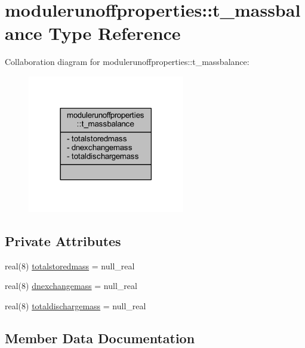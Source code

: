 \hypertarget{structmodulerunoffproperties_1_1t__massbalance}{}\section{modulerunoffproperties\+:\+:t\+\_\+massbalance Type Reference}
\label{structmodulerunoffproperties_1_1t__massbalance}


Collaboration diagram for modulerunoffproperties\+:\+:t\+\_\+massbalance\+:\nopagebreak
\begin{figure}[H]
\begin{center}
\leavevmode
\includegraphics[width=194pt]{structmodulerunoffproperties_1_1t__massbalance__coll__graph}
\end{center}
\end{figure}
\subsection*{Private Attributes}
\begin{DoxyCompactItemize}
\item 
real(8) \mbox{\hyperlink{structmodulerunoffproperties_1_1t__massbalance_a99bf0741d4cf9ff64fc8c08c5459c826}{totalstoredmass}} = null\+\_\+real
\item 
real(8) \mbox{\hyperlink{structmodulerunoffproperties_1_1t__massbalance_a23866e4b45f8b453fe6c22e7fc271a2e}{dnexchangemass}} = null\+\_\+real
\item 
real(8) \mbox{\hyperlink{structmodulerunoffproperties_1_1t__massbalance_a700b19895ba0ef6beb4bc912e62a473c}{totaldischargemass}} = null\+\_\+real
\end{DoxyCompactItemize}


\subsection{Member Data Documentation}
\mbox{\label{structmodulerunoffproperties_1_1t__massbalance_a23866e4b45f8b453fe6c22e7fc271a2e}} 
